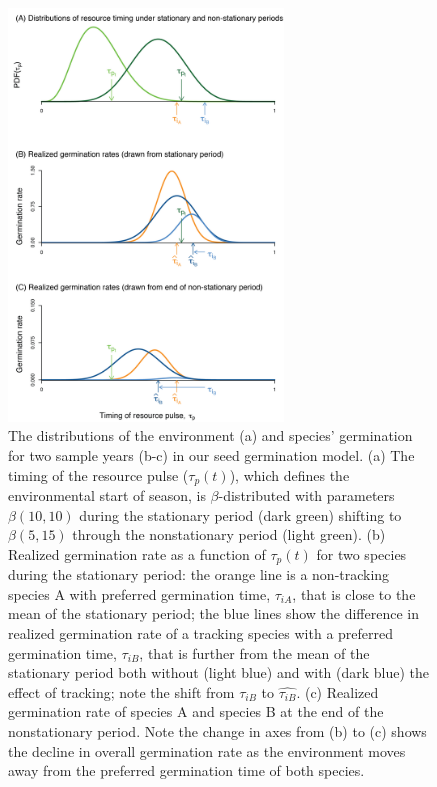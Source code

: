 \documentclass[11pt,letter]{article}
\begin{document}
\begin{figure}[t!]
\centering
\includegraphics[width=0.65\textwidth]{..//..//..//R/graphs/conceptual/TauP_GerminationAdj.png} 
\caption{The distributions of the environment (a) and species' germination for two sample years (b-c) in our seed germination model. (a) The timing of the resource pulse ($\tau_p(t)$), which defines the environmental start of season, is $\beta$-distributed with parameters $\beta(10,10)$ during the stationary period (dark green) shifting to $\beta (5,15)$ through the nonstationary period (light green). (b) Realized germination rate as a function of $\tau_p(t)$ for two species during the stationary period: the orange line is a non-tracking species A with preferred germination time, $\tau_{iA}$, that is close to the mean of the stationary period; the blue lines show the difference in realized germination rate of a tracking species with a preferred germination time, $\tau_{iB}$, that is further from the mean of the stationary period both without (light blue) and with (dark blue) the effect of tracking; note the shift from $\tau_{iB}$ to $\hat{\tau_{iB}}$. (c) Realized germination rate of species A and species B at the end of the nonstationary period. Note the change in axes from (b) to (c) shows the decline in overall germination rate as the environment moves away from the preferred germination time of both species.} %
\label{fig:concept}
\end{figure}
\end{document}
